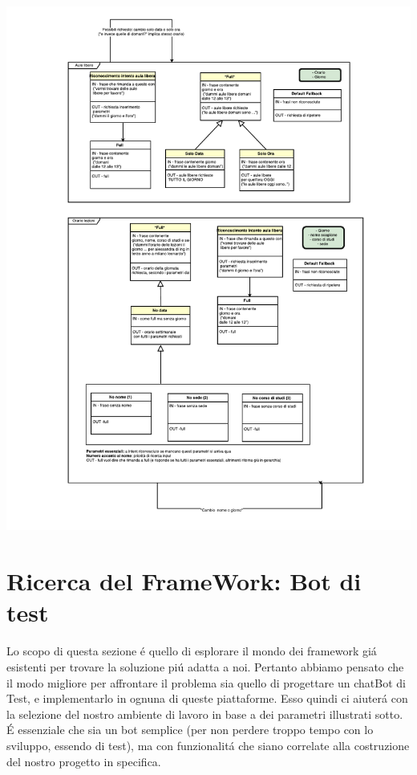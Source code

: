 \documentclass[]{article}
\begin{document}
\vspace*{-3cm}
\hspace*{-3cm} 
\includegraphics[width=1.6\textwidth]{p04}
\thispagestyle{empty}

\section{Ricerca del FrameWork: Bot di test}
Lo scopo di questa sezione é quello di esplorare il mondo dei framework giá esistenti per trovare la soluzione piú adatta a noi. Pertanto abbiamo pensato che il modo migliore per affrontare il problema sia quello di progettare un chatBot di Test, e implementarlo in ognuna di queste piattaforme. Esso quindi ci aiuterá con la selezione del nostro ambiente di lavoro in base a dei parametri illustrati sotto. É essenziale che sia un bot semplice (per non perdere troppo tempo con lo sviluppo, essendo di test), ma con funzionalitá che siano correlate alla costruzione del nostro progetto in specifica.
\end{document}
